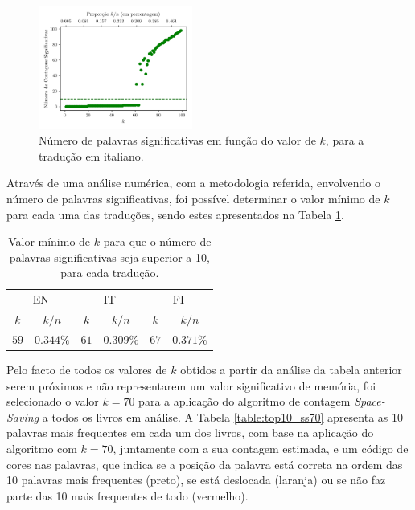 \documentclass[mirror, portugues]{revdetua}
\begin{document}
\begin{figure}[H]
    \centering
    \includegraphics[width=0.45\textwidth]{../assets/ss_signcount.png}
    \caption{Número de palavras significativas em função do valor de $k$, para a tradução em italiano.}
    \label{fig:meaningful_wordscount_k}
\end{figure}

Através de uma análise numérica, com a metodologia referida, envolvendo o número de palavras significativas, foi possível determinar o valor mínimo de $k$ para cada uma das traduções, sendo estes apresentados na Tabela \ref{table:min_k_for_SStop10}.

\begin{table}[H]
\centering
\caption{Valor mínimo de $k$ para que o número de palavras significativas seja superior a 10, para cada tradução.}
\label{table:min_k_for_SStop10}
\begin{tabular}{cc|cc|cc}
\toprule
\multicolumn{2}{c}{EN} & \multicolumn{2}{c}{IT} & \multicolumn{2}{c}{FI} \\
$k$ & $k/n$ & $k$ & $k/n$ & $k$ & $k/n$ \\
\midrule
$59$ & $0.344\%$ & $61$ & $0.309\%$ & $67$ & $0.371\%$ \\
\bottomrule
\end{tabular}
\end{table}

Pelo facto de todos os valores de $k$ obtidos a partir da análise da tabela anterior serem próximos e não representarem um valor significativo de memória, foi selecionado o valor $k = 70$ para a aplicação do algoritmo de contagem \textit{Space-Saving} a todos os livros em análise. A Tabela \ref{table:top10_ss70} apresenta as 10 palavras mais frequentes em cada um dos livros, com base na aplicação do algoritmo com $k = 70$, juntamente com a sua contagem estimada, e um código de cores nas palavras, que indica se a posição da palavra está correta na ordem das 10 palavras mais frequentes (preto), se está deslocada (laranja) ou se não faz parte das 10 mais frequentes de todo (vermelho).
\end{document}
